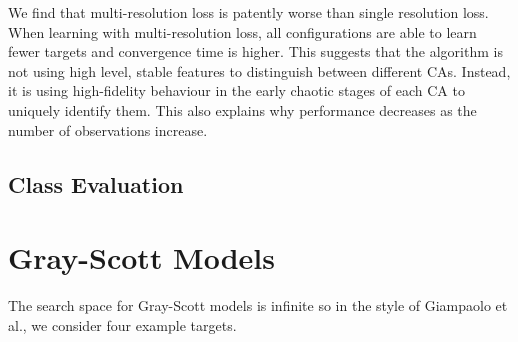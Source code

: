 \begin{table}
    \centering\hfill
    \hfill
    \hfill
\end{table}

We find that multi-resolution loss is patently worse than single resolution loss. When learning with multi-resolution loss, all configurations are able to learn fewer targets and convergence time is higher. This suggests that the algorithm is not using high level, stable features to distinguish between different CAs. Instead, it is using high-fidelity behaviour in the early chaotic stages of each CA to uniquely identify them. This also explains why performance decreases as the number of observations increase.

\subsection{Class Evaluation}

\section{Gray-Scott Models}

The search space for Gray-Scott models is infinite so in the style of Giampaolo et al.\cite{giampaolo2022physics}, we consider four example targets.

